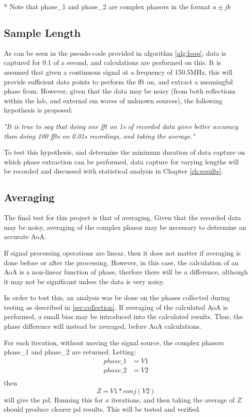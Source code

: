 \documentclass[class=report,11pt,crop=false]{standalone}
\begin{document}
* Note that phase\_1 and phase\_2 are complex phasors in the format $a \pm j b$
\subsection{Sample Length}
As can be seen in the pseudo-code provided in algorithm \ref{alg:loop}, data is captured for 0.1 of a second, and calculations are performed on this. It is assumed that given a continuous signal at a frequency of 150.5MHz, this will provide sufficient data points to perform the \gls{fft} on, and extract a meaningful phase from. However, given that the data may be noisy (from both reflections within the lab, and external \gls{em} waves of unknown sources), the following hypothesis is proposed: 

\emph{"It is true to say that doing one \gls{fft} on 1s of recorded data gives better accuracy than doing 100 \gls{fft}s on 0.01s recordings, and taking the average."}

To test this hypothesis, and determine the minimum duration of data capture on which phase extraction can be performed, data capture for varying lengths will be recorded and discussed with statistical analysis in Chapter \ref{ch:results}. 

\subsection{Averaging}
The final test for this project is that of averaging. Given that the recorded data may be noisy, averaging of the complex phasor may be necessary to determine an accurate \gls{AoA}.

If signal processing operations are linear, then it does not matter if averaging is done before or after the processing. However, in this case, the calculation of an \gls{AoA} is a non-linear function of phase, therfore there will be a difference, although it may not be significant unless the data is very noisy.

In order to test this, an analysis was be done on the phases collected during testing as described in \ref{sec:collection}. If averaging of the calculated \gls{AoA} is performed, a small bias may be introduced into the calculated results. Thus, the phase difference will instead be averaged, before \gls{AoA} calculations. 

For each iteration, without moving the signal source, the complex phasors phase\_1 and phase\_2 are returned. Letting:
\begin{equation*}
\begin{split}
    phase\_1 & = V1 \\
    phase\_2 & = V2 \\
\end{split}
\end{equation*}
then
\begin{equation*}
    Z = V1 * conj(V2)
 \end{equation*}  
will give the \gls{pd}. Running this for $x$ iterations, and then taking the average of $Z$ should produce clearer \gls{pd} results. This will be tested and verified. 
\end{document}
